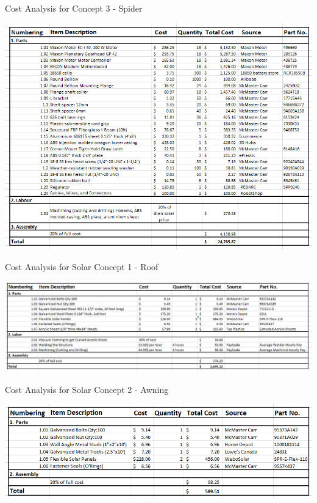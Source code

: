 \begin{table}[H]
  \caption{Cost Analysis for Concept 3 - Spider}
  \label{table:cost_spider}
  \includegraphics[width=\linewidth]{Cost/C3.PNG}
\end{table}

\begin{table}[H]
  \caption{Cost Analysis for Solar Concept 1 - Roof}
  \label{table:cost_solar_roof}
  \includegraphics[width=\linewidth]{Cost/S1.PNG}
\end{table}

\begin{table}[H]
  \caption{Cost Analysis for Solar Concept 2 - Awning}
  \label{table:cost_solar_awning}
  \includegraphics[width=\linewidth]{Cost/S2.PNG}
\end{table}

